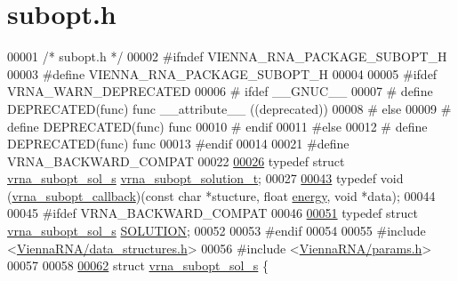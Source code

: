 \hypertarget{subopt_8h_source}{}\section{subopt.\+h}
\label{subopt_8h_source}

\begin{DoxyCode}
00001 \textcolor{comment}{/* subopt.h */}
00002 \textcolor{preprocessor}{#ifndef VIENNA\_RNA\_PACKAGE\_SUBOPT\_H}
00003 \textcolor{preprocessor}{#define VIENNA\_RNA\_PACKAGE\_SUBOPT\_H}
00004 
00005 \textcolor{preprocessor}{#ifdef VRNA\_WARN\_DEPRECATED}
00006 \textcolor{preprocessor}{# ifdef \_\_GNUC\_\_}
00007 \textcolor{preprocessor}{#  define DEPRECATED(func) func \_\_attribute\_\_ ((deprecated))}
00008 \textcolor{preprocessor}{# else}
00009 \textcolor{preprocessor}{#  define DEPRECATED(func) func}
00010 \textcolor{preprocessor}{# endif}
00011 \textcolor{preprocessor}{#else}
00012 \textcolor{preprocessor}{# define DEPRECATED(func) func}
00013 \textcolor{preprocessor}{#endif}
00014 
00021 \textcolor{preprocessor}{#define VRNA\_BACKWARD\_COMPAT}
00022 
\hyperlink{subopt_8h_a01ae9a0f27d245d89f705afd843fc457}{00026} \textcolor{keyword}{typedef} \textcolor{keyword}{struct }\hyperlink{structvrna__subopt__sol__s}{vrna\_subopt\_sol\_s}   \hyperlink{structvrna__subopt__sol__s}{vrna\_subopt\_solution\_t};
00027 
\hyperlink{group__subopt__wuchty_gaa0270c66d04f59e750401695b8282e04}{00043} \textcolor{keyword}{typedef} void (\hyperlink{group__subopt__wuchty_gaa0270c66d04f59e750401695b8282e04}{vrna\_subopt\_callback})(\textcolor{keyword}{const} \textcolor{keywordtype}{char} *stucture, \textcolor{keywordtype}{float} 
      \hyperlink{structvrna__subopt__sol__s_a99bc26ca68392aa4656386cf73b73fef}{energy}, \textcolor{keywordtype}{void} *data);
00044 
00045 \textcolor{preprocessor}{#ifdef VRNA\_BACKWARD\_COMPAT}
00046 
\hyperlink{subopt_8h_aa0f46ff02e1017469cf902d02ecd7f9a}{00051} \textcolor{keyword}{typedef} \textcolor{keyword}{struct }\hyperlink{structvrna__subopt__sol__s}{vrna\_subopt\_sol\_s}   \hyperlink{structvrna__subopt__sol__s}{SOLUTION};
00052 
00053 \textcolor{preprocessor}{#endif}
00054 
00055 \textcolor{preprocessor}{#include <\hyperlink{data__structures_8h}{ViennaRNA/data\_structures.h}>}
00056 \textcolor{preprocessor}{#include <\hyperlink{params_8h}{ViennaRNA/params.h}>}
00057 
00058 
\hyperlink{structvrna__subopt__sol__s}{00062} \textcolor{keyword}{struct }\hyperlink{structvrna__subopt__sol__s}{vrna\_subopt\_sol\_s} \{

\end{DoxyCode}

